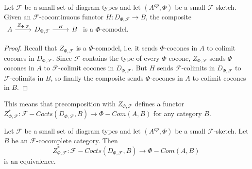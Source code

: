 \begin{lemma}
Let $\mathcal{F}$ be a small set of diagram types and let $(A^{op},\Phi)$ be a small $\mathcal{F}$-sketch. Given an $\mathcal{F}$-cocontinuous functor $H:D_{\Phi,\mathcal{F}}\to B$, the composite $\begin{tikzcd}
	A & D_{\Phi,\mathcal{F}} & B
	\arrow["Z_{\Phi,\mathcal{F}}", from=1-1, to=1-2]
	\arrow["H", from=1-2, to=1-3]
\end{tikzcd}$ is a $\Phi$-comodel.\end{lemma}
 \begin{proof}Recall that $Z_{\Phi,\mathcal{F}}$ is a $\Phi$-comodel, i.e. it sends $\Phi$-cocones in $A$ to colimit cocones in $D_{\Phi,\mathcal{F}}$. Since $\mathcal{F}$ contains the type of every $\Phi$-cocone, $Z_{\Phi,\mathcal{F}}$ sends $\Phi$-cocones in $A$ to $\mathcal{F}$-colimit cocones in $D_{\Phi,\mathcal{F}}$. But $H$ sends $\mathcal{F}$-colimits in $D_{\Phi,\mathcal{F}}$ to $\mathcal{F}$-colimits in $B$, so finally the composite sends $\Phi$-cocones in $A$ to colimit cocones in $B$.\end{proof}

This means that precomposition with $Z_{\Phi,\mathcal{F}}$ defines a functor $Z_{\Phi,\mathcal{F}}^*:\mathcal{F}-Cocts(D_{\Phi,\mathcal{F}},B)\to\Phi-Com(A,B)$ for any category $B$.

\begin{theorem}\cite[Theorem 6.23]{kelly/basic-concepts-enriched}\label{f_theory_small_sketch}
Let $\mathcal{F}$ be a small set of diagram types and let $(A^{op},\Phi)$ be a small $\mathcal{F}$-sketch. Let $B$ be an $\mathcal{F}$-cocomplete category. Then $$Z_{\Phi,\mathcal{F}}^*:\mathcal{F}-Cocts(D_{\Phi,\mathcal{F}},B)\to\Phi-Com(A,B)$$ is an equivalence.
\end{theorem}

